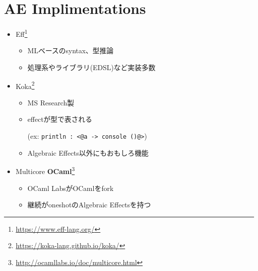 \section{AE Implimentations}
\begin{frame}[fragile]
    \frametitlesec

    \begin{itemize}
        \item Eff\footnote{\url{https://www.eff-lang.org/}}

            \begin{itemize}
                \item MLベースのsyntax、型推論
                \item 処理系やライブラリ(EDSL)など実装多数
            \end{itemize}

        \item Koka\footnote{\url{https://koka-lang.github.io/koka/}}

            \begin{itemize}
                \item MS Research製
                \item effectが型で表される

                    (ex: \lstinline{println : <@a -> console ()@>})
                \item Algebraic Effects以外にもおもしろ機能
            \end{itemize}

        \item Multicore \textbf{OCaml}\footnote{\url{http://ocamllabs.io/doc/multicore.html}}

            \begin{itemize}
                \item OCaml LabsがOCamlをfork
                \item 継続が\alert{oneshot}のAlgebraic Effectsを持つ
            \end{itemize}
    \end{itemize}
\end{frame}

